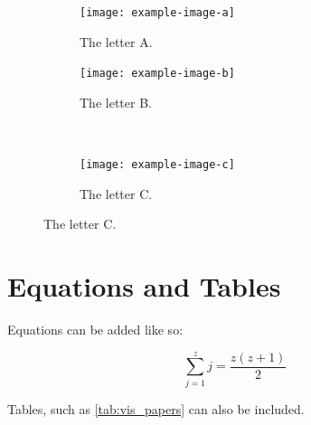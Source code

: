 \documentclass[journal]{vgtc}                %
\begin{document}
\begin{figure}[tbp]
  \centering
  \begin{subfigure}[b]{0.45\columnwidth}
  	\centering
  	\texttt{[image: example-image-a]}
  	\caption{The letter A.}
  	\label{fig:ex_subfigs_a}
  \end{subfigure}%
  \hfill%
  \begin{subfigure}[b]{0.45\columnwidth}
  	\centering
  	\texttt{[image: example-image-b]}
  	\caption{The letter B.}
  	\label{fig:ex_subfigs_b}
  \end{subfigure}%
  \\%
  \begin{subfigure}[b]{0.45\columnwidth}
  	\centering
  	\texttt{[image: example-image-c]}
  	\caption{The letter C.}
  	\label{fig:ex_subfigs_c}
  \end{subfigure}%
  \label{fig:ex_subfigs}
\end{figure}


\section{Equations and Tables}

Equations can be added like so:

\begin{equation}
  \label{eq:sum}
  \sum_{j=1}^{z} j = \frac{z(z+1)}{2}
\end{equation}

Tables, such as \cref{tab:vis_papers} can also be included.
\end{document}
